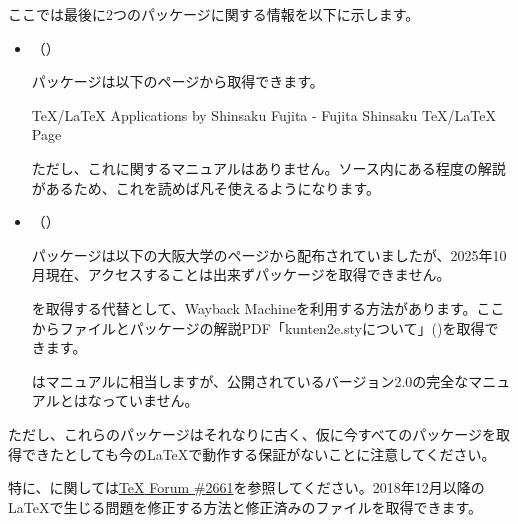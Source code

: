 \documentclass[uplatex, dvipdfmx, paper=a4paper, line_length=45zw, head_space=7zw, foot_space=10zw]{jlreq}
\begin{document}
\vfil

ここでは最後に2つのパッケージに関する情報を以下に示します。

\begin{itemize}
  \item {\large{}}（）

  パッケージは以下のページから取得できます。

  {\noindent}TeX/LaTeX Applications by Shinsaku Fujita - Fujita Shinsaku TeX/LaTeX Page

  ただし、これに関するマニュアルはありません。ソース内にある程度の解説があるため、これを読めば凡そ使えるようになります。
  \vspace{1zw}
  \item {\large{}}（）

  パッケージは以下の大阪大学のページから配布されていましたが、2025年10月現在、アクセスすることは出来ずパッケージを取得できません。

  を取得する代替として、Wayback Machineを利用する方法があります。ここからファイルとパッケージの解説PDF「kunten2e.styについて」()を取得できます。

  はマニュアルに相当しますが、公開されているバージョン2.0の完全なマニュアルとはなっていません。
\end{itemize}

ただし、これらのパッケージはそれなりに古く、仮に今すべてのパッケージを取得できたとしても今の{\LaTeX}で動作する保証がないことに注意してください。

特に、に関しては\href{https://okumuralab.org/tex/mod/forum/discuss.php?d=2661}{{\TeX} Forum \#\textsf{2661}}を参照してください。2018年12月以降の{\LaTeX}で生じる問題を修正する方法と修正済みのファイルを取得できます。
\end{document}
